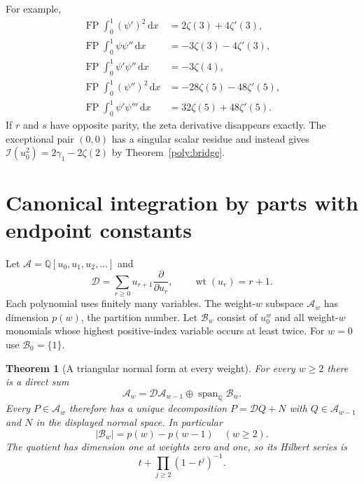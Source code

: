 \documentclass[11pt,a4paper]{article}
\numberwithin{equation}{section}
\newtheorem{theorem}{Theorem}[section]
\theoremstyle{definition}
\theoremstyle{remark}
\DeclareMathOperator{\FP}{FP}
\DeclareMathOperator{\wt}{wt}
\newcommand{\dd}{\,\mathrm d}
\newcommand{\Q}{\mathbb Q}
\newcommand{\cI}{\mathcal I}
\newcommand{\cD}{\mathcal D}
\begin{document}
For example,
\begin{align}
 \FP\int_0^1(\psi')^2\dd x&=2\zeta(3)+4\zeta'(3),\label{poly:trigamma2}\\
 \FP\int_0^1\psi\psi''\dd x&=-3\zeta(3)-4\zeta'(3),\\
 \FP\int_0^1\psi'\psi''\dd x&=-3\zeta(4),\\
 \FP\int_0^1(\psi'')^2\dd x&=-28\zeta(5)-48\zeta'(5),\\
 \FP\int_0^1\psi'\psi'''\dd x&=32\zeta(5)+48\zeta'(5).
\end{align}
If $r$ and $s$ have opposite parity, the zeta derivative disappears
exactly. The exceptional pair $(0,0)$ has a singular scalar residue
and instead gives $\cI(u_0^2)=2\gamma_1-2\zeta(2)$ by
Theorem~\ref{poly:bridge}.



\section{Canonical integration by parts with endpoint constants}
\label{poly:normalform}

Let $\mathcal A=\Q[u_0,u_1,u_2,\ldots]$ and
\[
 \cD=\sum_{r\ge0}u_{r+1}\frac{\partial}{\partial u_r},\qquad
 \wt(u_r)=r+1.
\]
Each polynomial uses finitely many variables. The weight-$w$ subspace
$\mathcal A_w$ has dimension $p(w)$, the partition number.
Let $\mathcal B_w$ consist of $u_0^w$ and all weight-$w$ monomials
whose highest positive-index variable occurs at least twice.
For $w=0$ use $\mathcal B_0=\{1\}$.

\begin{theorem}[A triangular normal form at every weight]
\label{poly:IBP}
For every $w\ge2$ there is a direct sum
\begin{equation}\label{poly:directsum}
 \mathcal A_w=\cD\mathcal A_{w-1}\oplus
                      \operatorname{span}_{\Q}\mathcal B_w.
\end{equation}
Every $P\in\mathcal A_w$ therefore has a unique decomposition
$P=\cD Q+N$ with $Q\in\mathcal A_{w-1}$ and $N$ in the displayed normal space. In particular
\begin{equation}\label{poly:dimension}
 |\mathcal B_w|=p(w)-p(w-1)\quad(w\ge2).
\end{equation}
The quotient has dimension one at weights zero and one, so its
Hilbert series is
\begin{equation}\label{poly:Hilbert}
 t+\prod_{j\ge2}(1-t^j)^{-1}.
\end{equation}
\end{theorem}
\end{document}
